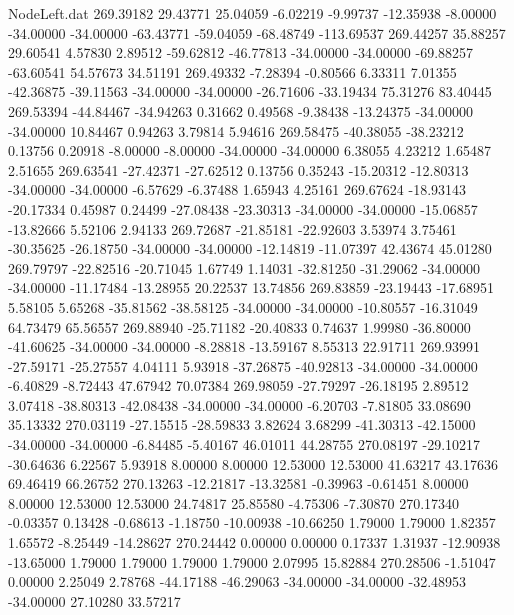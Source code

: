 \begin{filecontents}{NodeLeft.dat}
 269.39182   29.43771   25.04059    -6.02219   -9.99737  -12.35938   -8.00000  -34.00000  -34.00000  -63.43771  -59.04059  -68.48749 -113.69537
 269.44257   35.88257   29.60541     4.57830    2.89512  -59.62812  -46.77813  -34.00000  -34.00000  -69.88257  -63.60541   54.57673   34.51191
 269.49332   -7.28394   -0.80566     6.33311    7.01355  -42.36875  -39.11563  -34.00000  -34.00000  -26.71606  -33.19434   75.31276   83.40445
 269.53394  -44.84467  -34.94263     0.31662    0.49568   -9.38438  -13.24375  -34.00000  -34.00000   10.84467    0.94263    3.79814    5.94616
 269.58475  -40.38055  -38.23212     0.13756    0.20918   -8.00000   -8.00000  -34.00000  -34.00000    6.38055    4.23212    1.65487    2.51655
 269.63541  -27.42371  -27.62512     0.13756    0.35243  -15.20312  -12.80313  -34.00000  -34.00000   -6.57629   -6.37488    1.65943    4.25161
 269.67624  -18.93143  -20.17334     0.45987    0.24499  -27.08438  -23.30313  -34.00000  -34.00000  -15.06857  -13.82666    5.52106    2.94133
 269.72687  -21.85181  -22.92603     3.53974    3.75461  -30.35625  -26.18750  -34.00000  -34.00000  -12.14819  -11.07397   42.43674   45.01280
 269.79797  -22.82516  -20.71045     1.67749    1.14031  -32.81250  -31.29062  -34.00000  -34.00000  -11.17484  -13.28955   20.22537   13.74856
 269.83859  -23.19443  -17.68951     5.58105    5.65268  -35.81562  -38.58125  -34.00000  -34.00000  -10.80557  -16.31049   64.73479   65.56557
 269.88940  -25.71182  -20.40833     0.74637    1.99980  -36.80000  -41.60625  -34.00000  -34.00000   -8.28818  -13.59167    8.55313   22.91711
 269.93991  -27.59171  -25.27557     4.04111    5.93918  -37.26875  -40.92813  -34.00000  -34.00000   -6.40829   -8.72443   47.67942   70.07384
 269.98059  -27.79297  -26.18195     2.89512    3.07418  -38.80313  -42.08438  -34.00000  -34.00000   -6.20703   -7.81805   33.08690   35.13332
 270.03119  -27.15515  -28.59833     3.82624    3.68299  -41.30313  -42.15000  -34.00000  -34.00000   -6.84485   -5.40167   46.01011   44.28755
 270.08197  -29.10217  -30.64636     6.22567    5.93918    8.00000    8.00000   12.53000   12.53000   41.63217   43.17636   69.46419   66.26752
 270.13263  -12.21817  -13.32581    -0.39963   -0.61451    8.00000    8.00000   12.53000   12.53000   24.74817   25.85580   -4.75306   -7.30870
 270.17340   -0.03357    0.13428    -0.68613   -1.18750  -10.00938  -10.66250    1.79000    1.79000    1.82357    1.65572   -8.25449  -14.28627
 270.24442    0.00000    0.00000     0.17337    1.31937  -12.90938  -13.65000    1.79000    1.79000    1.79000    1.79000    2.07995   15.82884
 270.28506   -1.51047    0.00000     2.25049    2.78768  -44.17188  -46.29063  -34.00000  -34.00000  -32.48953  -34.00000   27.10280   33.57217

\end{filecontents}
